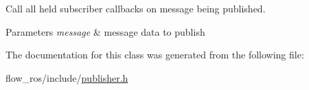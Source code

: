 Call all held subscriber callbacks on message being published. 


\begin{DoxyParams}{Parameters}
{\em message} & message data to publish \\
\hline
\end{DoxyParams}


The documentation for this class was generated from the following file\+:\begin{DoxyCompactItemize}
\item 
flow\+\_\+ros/include/\hyperlink{publisher_8h}{publisher.\+h}\end{DoxyCompactItemize}
